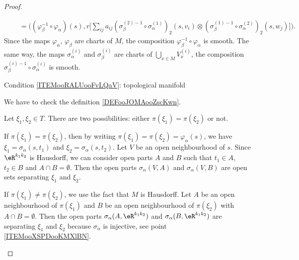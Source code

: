 \begin{proof}
\begin{subproof}
\begin{subproof}
\begin{subequations}
\begin{align}
					 & \quad = \Big( (\varphi_{\beta}^{-1}\circ\varphi_{\alpha})(s),r\big[  \sum_{ij}a_{ij}(\sigma_{\beta}^{(2)-1}\circ\sigma_{\alpha}^{(1)})_2(s,v_i)\otimes (\sigma_{\beta}^{(1)-1}\circ\sigma_{\alpha}^{(2)})_2(s,w_j) \big] \Big).
				\end{align}
			\end{subequations}
			Since the maps \( \varphi_{\alpha}\), \( \varphi_{\beta}\) are charts of \( M\), the composition \( \varphi_{\beta}^{-1}\circ\varphi_{\alpha}\) is smooth. The same way, the maps \( \sigma_{\alpha}^{(i)}\) and \( \sigma_{\beta}^{(i)} \) are charts of \( \bigcup_{x\in M}V_x^{(i)}\), the composition \( \sigma_{\beta}^{(i)-1}\circ \sigma_{\alpha}^(i)\) is smooth.
		\end{subproof}
	\end{subproof}

	\begin{proofpart}
		Condition \ref{ITEMooRALUooFvLQaV}: topological manifold
	\end{proofpart}
	We have to check the definition \ref{DEFooJOMAooZscKwn}.
	\begin{subproof}




		Let \( \xi_1,\xi_2\in T\). There are two possibilities: either \( \pi(\xi_1)=\pi(\xi_2)\) or not.

		If \( \pi(\xi_1)=\pi(\xi_2)\), then by writing \( \pi(\xi_1)=\pi(\xi_2)=\varphi_{\alpha}(s)\), we have \( \xi_1=\sigma_{\alpha}(s,t_1)\) and \( \xi_2=\sigma_{\alpha}(s,t_2)\). Let \( V\) be an open neighbourhood of \( s\). Since \( \eR^{k_1k_2}\) is Hausdorff, we can consider open parts \( A\) and \( B\) such that \( t_1\in A\), \( t_2\in B\) and \( A\cap B=\emptyset\). Then the open parts \( \sigma_{\alpha}(V,A)\) and \( \sigma_{\alpha}(V,B)\) are open sets separating \( \xi_1\) and \( \xi_2\).

		If \( \pi(\xi_1)\neq \pi(\xi_2)\), we use the fact that \( M\) is Hausdorff. Let \( A\) be an open neighbourhood of \( \pi(\xi_1)\) and \( B\) be an open neighbourhood of \( \pi(\xi_2)\) with \( A\cap B=\emptyset\). Then the open parts \( \sigma_{\alpha}(A,\eR^{k_1k_2})\) and \( \sigma_{\alpha}(B,\eR^{k_1k_2})\) are separating \( \xi_1\) and \( \xi_2\) because \(\sigma_{\alpha}   \) is injective, see point \ref{ITEMooXSPDooKMXlBN}.


\end{subproof}
\end{proof}

